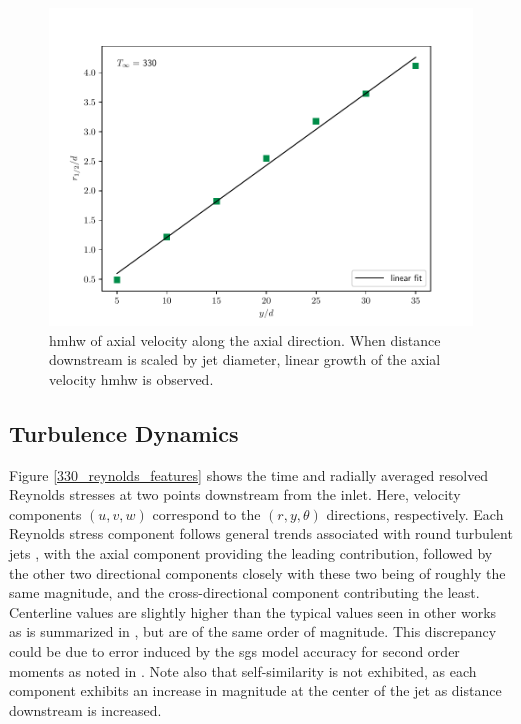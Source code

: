 \begin{figure}[htbp!]
\begin{center}
	\includegraphics[scale=.7]{figures/Plots/radial/slices_5/same_ambient/r12_d_vs_x_d.pdf}
	\caption{\gls{hmhw} of axial velocity along the axial direction. When distance downstream is scaled by jet diameter, linear growth of the axial velocity \gls{hmhw} is observed.} \label{330_hwhm_scaling}
\end{center}
\end{figure}

\subsection{Turbulence Dynamics}
Figure \ref{330_reynolds_features} shows the time and radially averaged resolved Reynolds stresses at two points downstream from the inlet. Here, velocity components $(u,v,w)$ correspond to the $(r,y,\theta)$ directions, respectively. Each Reynolds stress component follows general trends associated with round turbulent jets \cite{Pope, iso_comp_1_ref_1}, with the axial component providing the leading contribution, followed by the other two directional components closely with these two being of roughly the same magnitude, and the cross-directional component contributing the least. Centerline values are slightly higher than the typical values seen in other works as is summarized in \cite{iso_comp_1_ref_1}, but are of the same order of magnitude. This discrepancy could be due to error induced by the \gls{sgs} model accuracy for second order moments as noted in \cite{doi:10.1063/1.4937948}. Note also that self-similarity is not exhibited, as each component exhibits an increase in magnitude at the center of the jet as distance downstream is increased. 

